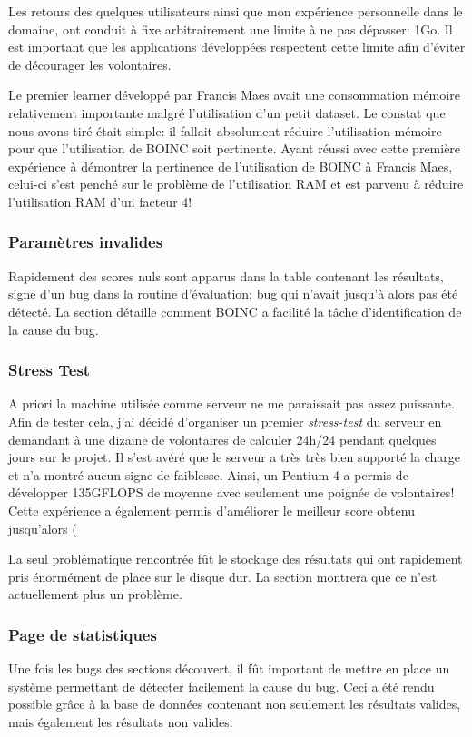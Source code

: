 \documentclass[a4paper, 11pt]{report}
\begin{document}
Les retours des quelques utilisateurs ainsi que mon expérience personnelle dans le domaine, ont conduit à fixe arbitrairement une limite à ne pas dépasser: 1Go. Il est important que les applications développées respectent cette limite afin d'éviter de décourager les volontaires.

Le premier learner développé par Francis Maes avait une consommation mémoire relativement importante malgré l'utilisation d'un petit dataset. Le constat que nous avons tiré était simple: il fallait absolument réduire l'utilisation mémoire pour que l'utilisation de \textsc{BOINC} soit pertinente. Ayant réussi avec cette première expérience à démontrer la pertinence de l'utilisation de \textsc{BOINC} à Francis Maes, celui-ci s'est penché sur le problème de l'utilisation RAM et est parvenu à réduire l'utilisation RAM d'un facteur 4!

\subsubsection{Paramètres invalides}
Rapidement des scores nuls sont apparus dans la table contenant les résultats, signe d'un bug dans la routine d'évaluation; bug qui n'avait jusqu'à alors pas été détecté. La section %
détaille comment \textsc{BOINC} a facilité la tâche d'identification de la cause du bug.


\subsubsection{Stress Test}
A priori la machine utilisée comme serveur ne me paraissait pas assez puissante. Afin de tester cela, j'ai décidé d'organiser un premier \textit{stress-test} du serveur en demandant à une dizaine de volontaires de calculer 24h/24 pendant quelques jours sur le projet. Il s'est avéré que le serveur a très très bien supporté la charge et n'a montré aucun signe de faiblesse. Ainsi, un Pentium 4 a permis de développer 135GFLOPS de moyenne avec seulement une poignée de volontaires! Cette expérience a également permis d'améliorer le meilleur score obtenu jusqu'alors (%
 
La seul problématique rencontrée fût le stockage des résultats qui ont rapidement pris énormément de place sur le disque dur. La section %
montrera que ce n'est actuellement plus un problème. 

\subsubsection{Page de statistiques}
Une fois les bugs des sections  %
découvert, il fût important de mettre en place un système permettant de détecter facilement la cause du bug. Ceci a été rendu possible grâce à la base de données contenant non seulement les résultats valides, mais également les résultats non valides.
\end{document}
